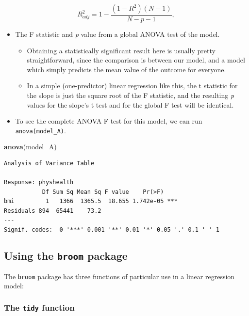 \documentclass[]{book}
\newenvironment{Shaded}{\begin{snugshade}}{\end{snugshade}}
\newcommand{\KeywordTok}[1]{\textcolor[rgb]{0.13,0.29,0.53}{\textbf{#1}}}
\newcommand{\NormalTok}[1]{#1}
\providecommand{\tightlist}{%
  \setlength{\itemsep}{0pt}\setlength{\parskip}{0pt}}
\theoremstyle{definition}
\theoremstyle{definition}
\theoremstyle{definition}
\theoremstyle{remark}
\begin{document}
\[
R^2_{adj} = 1 - \frac{(1 - R^2)(N - 1)}{N - p - 1},
\]

\begin{itemize}
\tightlist
\item
  The F statistic and \emph{p} value from a global ANOVA test of the
  model.

  \begin{itemize}
  \tightlist
  \item
    Obtaining a statistically significant result here is usually pretty
    straightforward, since the comparison is between our model, and a
    model which simply predicts the mean value of the outcome for
    everyone.
  \item
    In a simple (one-predictor) linear regression like this, the t
    statistic for the slope is just the square root of the F statistic,
    and the resulting \emph{p} values for the slope's t test and for the
    global F test will be identical.
  \end{itemize}
\item
  To see the complete ANOVA F test for this model, we can run
  \texttt{anova(model\_A)}.
\end{itemize}

\begin{Shaded}
\begin{Highlighting}[]
\KeywordTok{anova}\NormalTok{(model_A)}
\end{Highlighting}
\end{Shaded}

\begin{verbatim}
Analysis of Variance Table

Response: physhealth
           Df Sum Sq Mean Sq F value    Pr(>F)    
bmi         1   1366  1365.5  18.655 1.742e-05 ***
Residuals 894  65441    73.2                      
---
Signif. codes:  0 '***' 0.001 '**' 0.01 '*' 0.05 '.' 0.1 ' ' 1
\end{verbatim}

\subsection{\texorpdfstring{Using the \texttt{broom}
package}{Using the broom package}}\label{using-the-broom-package}

The \texttt{broom} package has three functions of particular use in a
linear regression model:

\subsubsection{\texorpdfstring{The \texttt{tidy}
function}{The tidy function}}\label{the-tidy-function}
\end{document}
